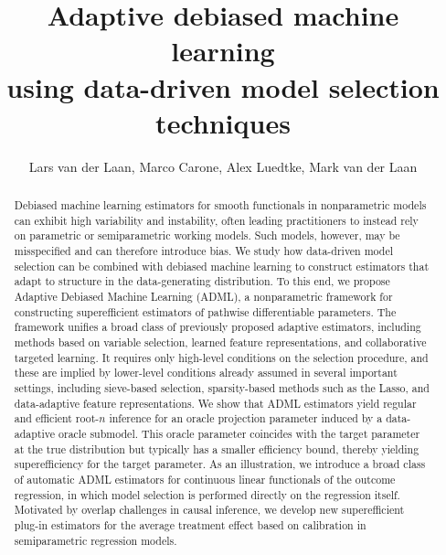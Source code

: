 \documentclass[11pt]{article}
\title{Adaptive debiased machine learning\\ using data-driven model selection techniques}
\author{Lars van der Laan, Marco Carone,  Alex Luedtke, Mark van der Laan}
\theoremstyle{definition}
\begin{document}
\singlespacing
\maketitle
\begin{abstract}
Debiased machine learning estimators for smooth functionals in nonparametric models can exhibit high variability and instability, often leading practitioners to instead rely on parametric or semiparametric working models. Such models, however, may be misspecified and can therefore introduce bias. We study how data-driven model selection can be combined with debiased machine learning to construct estimators that adapt to structure in the data-generating distribution. To this end, we propose Adaptive Debiased Machine Learning (ADML), a nonparametric framework for constructing superefficient estimators of pathwise differentiable parameters. The framework unifies a broad class of previously proposed adaptive estimators, including methods based on variable selection, learned feature representations, and collaborative targeted learning. It requires only high-level conditions on the selection procedure, and these are implied by lower-level conditions already assumed in several important settings, including sieve-based selection, sparsity-based methods such as the Lasso, and data-adaptive feature representations. We show that ADML estimators yield regular and efficient root-\(n\) inference for an oracle projection parameter induced by a data-adaptive oracle submodel. This oracle parameter coincides with the target parameter at the true distribution but typically has a smaller efficiency bound, thereby yielding superefficiency for the target parameter. As an illustration, we introduce a broad class of automatic ADML estimators for continuous linear functionals of the outcome regression, in which model selection is performed directly on the regression itself. Motivated by overlap challenges in causal inference, we develop new superefficient plug-in estimators for the average treatment effect based on calibration in semiparametric regression models.



 


\end{abstract}
\end{document}
